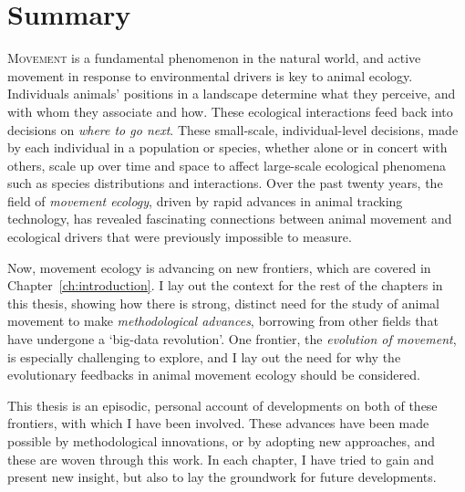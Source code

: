\chapter*{Summary}
\begingroup


\lettrine{M}{ovement} is a fundamental phenomenon in the natural world, and active movement in response to environmental drivers is key to animal ecology.
Individuals animals' positions in a landscape determine what they perceive, and with whom they associate and how.
These ecological interactions feed back into decisions on \textit{where to go next}.
These small-scale, individual-level decisions, made by each individual in a population or species, whether alone or in concert with others, scale up over time and space to affect large-scale ecological phenomena such as species distributions and interactions.
Over the past twenty years, the field of \textit{movement ecology}, driven by rapid advances in animal tracking technology, has revealed fascinating connections between animal movement and ecological drivers that were previously impossible to measure.

\medskip

\noindent Now, movement ecology is advancing on new frontiers, which are covered in Chapter~\ref{ch:introduction}.
I lay out the context for the rest of the chapters in this thesis, showing how there is strong, distinct need for the study of animal movement to make \textit{methodological advances}, borrowing from other fields that have undergone a `big-data revolution'.
One frontier, the \textit{evolution of movement}, is especially challenging to explore, and I lay out the need for why the evolutionary feedbacks in animal movement ecology should be considered.

\medskip

\noindent This thesis is an episodic, personal account of developments on both of these frontiers, with which I have been involved.
These advances have been made possible by methodological innovations, or by adopting new approaches, and these are woven through this work. 
In each chapter, I have tried to gain and present new insight, but also to lay the groundwork for future developments.

